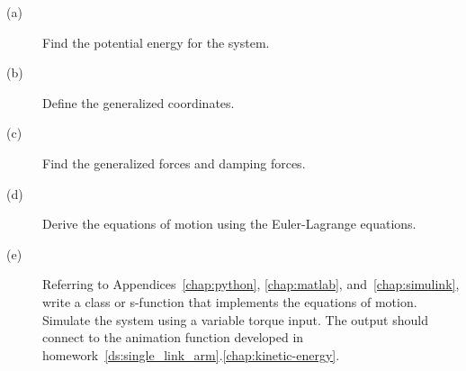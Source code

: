 \begin{description}\item[]
    \item[(a)] Find the potential energy for the system.
    \item[(b)] Define the generalized coordinates.
    \item[(c)] Find the generalized forces and damping forces.
    \item[(d)] Derive the equations of motion using the Euler-Lagrange equations.
    \item[(e)] Referring to Appendices~\ref{chap:python}, \ref{chap:matlab}, and~\ref{chap:simulink}, write a class or s-function that implements the equations of motion.  Simulate the system using a variable torque input.  The output should connect to the animation function developed in homework~\ref{ds:single_link_arm}.\ref{chap:kinetic-energy}.
\end{description}